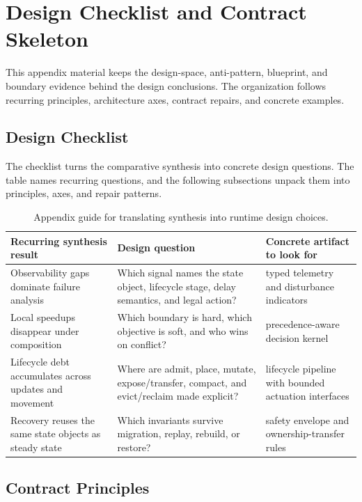 \section{Design Checklist and Contract Skeleton}

This appendix material keeps the design-space, anti-pattern, blueprint, and boundary evidence behind the design conclusions. The organization follows recurring principles, architecture axes, contract repairs, and concrete examples.

\subsection{Design Checklist}

The checklist turns the comparative synthesis into concrete design questions. The table names recurring questions, and the following subsections unpack them into principles, axes, and repair patterns.

\begin{table}[H]
\small
\centering
\caption{Appendix guide for translating synthesis into runtime design choices.}
\label{tab:supp-design-guide}
\begin{tabular}{@{}p{}p{}p{}@{}}
\toprule
Recurring synthesis result & Design question & Concrete artifact to look for \\
\midrule
Observability gaps dominate failure analysis & Which signal names the state object, lifecycle stage, delay semantics, and legal action? & typed telemetry and disturbance indicators \\
Local speedups disappear under composition & Which boundary is hard, which objective is soft, and who wins on conflict? & precedence-aware decision kernel \\
Lifecycle debt accumulates across updates and movement & Where are admit, place, mutate, expose/transfer, compact, and evict/reclaim made explicit? & lifecycle pipeline with bounded actuation interfaces \\
Recovery reuses the same state objects as steady state & Which invariants survive migration, replay, rebuild, or restore? & safety envelope and ownership-transfer rules \\
\bottomrule
\end{tabular}
\end{table}

\subsection{Contract Principles}

